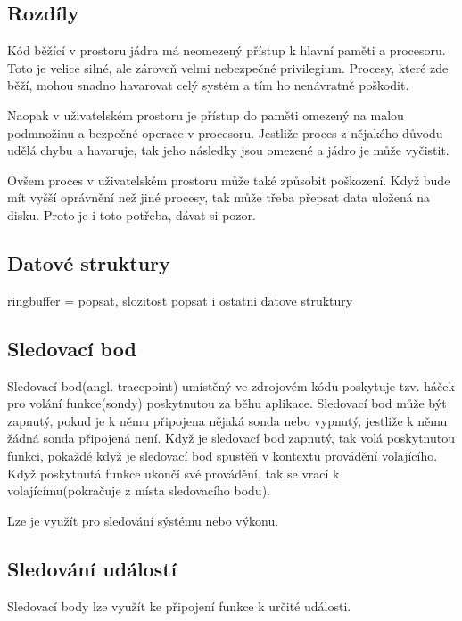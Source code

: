 \subsection*{Rozdíly}
Kód běžící v prostoru jádra má neomezený přístup k hlavní paměti a procesoru. Toto je velice silné, ale zároveň velmi nebezpečné privilegium.
Procesy, které zde běží, mohou snadno havarovat celý systém a tím ho nenávratně poškodit.

Naopak v uživatelském prostoru je přístup do paměti omezený na malou podmnožinu a bezpečné operace v procesoru. Jestliže proces z nějakého
důvodu udělá chybu a havaruje, tak jeho následky jsou omezené a jádro je může vyčistit.

Ovšem proces v uživatelském prostoru může také způsobit poškození. Když bude mít vyšší oprávnění než jiné procesy, tak může třeba přepsat
data uložená na disku. Proto je i toto potřeba, dávat si pozor.

\subsection{Datové struktury}
ringbuffer = popsat, slozitost
popsat i ostatni datove struktury

\subsection{Sledovací bod}
Sledovací bod(angl. tracepoint) umístěný ve zdrojovém kódu poskytuje tzv. háček pro volání funkce(sondy) poskytnutou za běhu aplikace.
Sledovací bod může být zapnutý, pokud je k němu připojena nějaká sonda nebo vypnutý, jestliže k němu žádná sonda připojená není. Když je
sledovací bod zapnutý, tak volá poskytnutou funkci, pokaždé když je sledovací bod spustěň v kontextu provádění volajícího. Když poskytnutá
funkce ukončí své provádění, tak se vrací k volajícímu(pokračuje z místa sledovacího bodu).

Lze je využít pro sledování sýstému nebo výkonu.

\subsection {Sledování událostí}
Sledovací body lze využít ke připojení funkce k určité události.

